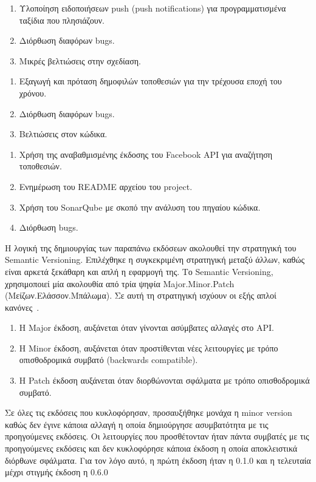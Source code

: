 \documentclass[oneside, 12pt]{book}
\begin{document}
{\large \color{blue}{TripAssistant 0.4.0}}
\begin{enumerate}
    \item Υλοποίηση ειδοποιήσεων push (push notifications) για προγραμματισμένα ταξίδια που πλησιάζουν.
    \item Διόρθωση διαφόρων bugs.
    \item Μικρές βελτιώσεις στην σχεδίαση.
\end{enumerate}

{\large \color{blue}{TripAssistant 0.5.0}}
\begin{enumerate}
    \item Εξαγωγή και πρόταση δημοφιλών τοποθεσιών για την τρέχουσα εποχή του χρόνου.
    \item Διόρθωση διαφόρων bugs.
    \item Βελτιώσεις στον κώδικα.
\end{enumerate}

{\large \color{blue}{TripAssistant 0.6.0}}
\begin{enumerate}
    \item Χρήση της αναβαθμισμένης έκδοσης του Facebook API για αναζήτηση τοποθεσιών.
    \item Ενημέρωση του README αρχείου του project.
    \item Χρήση του SonarQube με σκοπό την ανάλυση του πηγαίου κώδικα.
    \item Διόρθωση bugs.
\end{enumerate}

Η λογική της δημιουργίας των παραπάνω εκδόσεων ακολουθεί την 
στρατηγική του Semantic Versioning. Επιλέχθηκε η συγκεκριμένη 
στρατηγική μεταξύ άλλων, καθώς είναι αρκετά ξεκάθαρη και απλή η 
εφαρμογή της.
Το Semantic Versioning, χρησιμοποιεί μία ακολουθία από τρία ψηφία Major.Minor.Patch (Μείζων.Ελάσσον.Μπάλωμα).
Σε αυτή τη στρατηγική ισχύουν οι εξής απλοί κανόνες~\cite{preston2013semantic}.
\begin{enumerate}
    \item Η Major έκδοση, αυξάνεται όταν γίνονται ασύμβατες αλλαγές στο API. 
    \item Η Minor έκδοση, αυξάνεται όταν προστίθενται νέες λειτουργίες με τρόπο οπισθοδρομικά συμβατό (backwards compatible).
    \item Η Patch έκδοση αυξάνεται όταν διορθώνονται σφάλματα με τρόπο οπισθοδρομικά συμβατό.
\end{enumerate}


Σε όλες τις εκδόσεις που κυκλοφόρησαν, προσαυξήθηκε μονάχα η minor version 
καθώς δεν έγινε κάποια αλλαγή η οποία δημιούργησε ασυμβατότητα με 
τις προηγούμενες εκδόσεις.
Οι λειτουργίες που προσθέτονταν ήταν πάντα συμβατές με τις 
προηγούμενες εκδόσεις και δεν κυκλοφόρησε κάποια έκδοση η οποία 
αποκλειστικά διόρθωνε σφάλματα.
Για τον λόγο αυτό, η πρώτη έκδοση ήταν η 0.1.0 και η τελευταία μέχρι 
στιγμής έκδοση η 0.6.0
\end{document}
